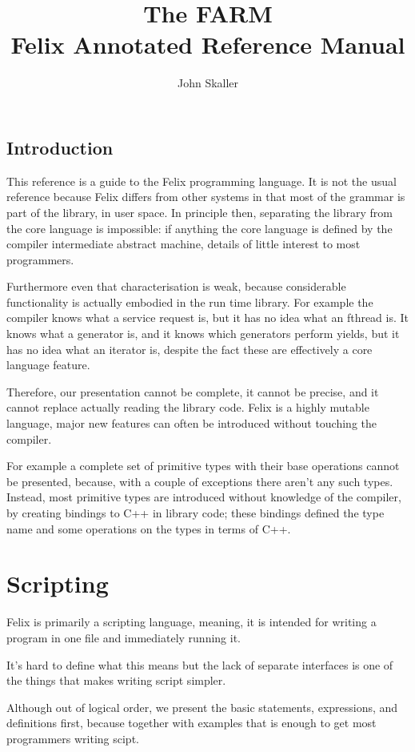 \documentclass[oneside]{book}
\title{The FARM\\ Felix Annotated Reference Manual}
\author{John Skaller}
\begin{document}
\maketitle
\tableofcontents
\chapter{Introduction}
This reference is a guide to the Felix programming language.
It is not the usual reference because Felix differs from
other systems in that most of the grammar is part of the library,
in user space. In principle then, separating the library from the 
core language is impossible: if anything the core language is
defined by the compiler intermediate abstract machine, details
of little interest to most programmers.

Furthermore even that characterisation is weak, because considerable
functionality is actually embodied in the run time library. For example
the compiler knows what a service request is, but it has no idea
what an fthread is. It knows what a generator is, and it knows which
generators perform yields, but it has no idea what an iterator is,
despite the fact these are effectively a core language feature.

Therefore, our presentation cannot be complete, it cannot be precise,
and it cannot replace actually reading the library code. Felix is a highly
mutable language, major new features can often be introduced without
touching the compiler.

For example a complete set of primitive types with their base
operations cannot be presented, because, with a couple of exceptions
there aren't any such types. Instead, most primitive types are introduced
without knowledge of the compiler, by creating bindings to C++ in 
library code; these bindings defined the type name and some operations
on the types in terms of C++.

\part{Scripting}
Felix is primarily a scripting language, meaning, it is intended
for writing a program in one file and immediately running it.

It's hard to define what this means but the lack of separate 
interfaces  is one of the things that makes writing script simpler.

Although out of logical order, we present the basic statements,
expressions, and definitions first, because together with examples
that is enough to get most programmers writing scipt.
\end{document}
